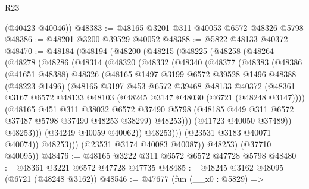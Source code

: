\begin{lexlean}{R23}
\begin{coremodule}
      (@40423 @40046))
@48383 := @48165 @3201 @311 @40053 @6572 @48326 @5798
@48386 := @48201 @3200 @39529 @40052
@48388 := @5822 @48133 @40372
@48470 := @48184
    (@48194
      (@48200
        (@48215
          (@48225
            (@48258
              (@48264
                (@48278
                  (@48286
                    (@48314
                      (@48320
                        (@48332
                          (@48340
                            (@48377
                              (@48383
                                (@48386
                                  (@41651 @48388)
                                  @48326
                                  (@48165
                                    @1497
                                    @3199
                                    @6572
                                    @39528
                                    @1496
                                    @48388
                                    (@48223 @1496)
                                    (@48165
                                      @3197
                                      @453
                                      @6572
                                      @39468
                                      @48133
                                      @40372
                                      (@48361
                                        @3167
                                        @6572
                                        @48133
                                        @48103
                                        (@48245 @3147 @48030 (@6721 (@48248 @3147))))
                                      (@48165
                                        @451
                                        @311
                                        @38032
                                        @6572
                                        @37490
                                        @5798
                                        (@48185 @449 @311 @6572 @37487 @5798 @37490 @48253 @38299)
                                        @48253)))
                                  (@41723 @40050 @37489))
                                @48253)))
                          (@34249 @40059 @40062))
                        @48253)))
                  (@23531 @3183 @40071 @40074))
                @48253)))
          (@23531 @3174 @40083 @40087))
        @48253)
      (@37710 @40095))
@48476 := @48165 @3222 @311 @6572 @6572 @47728 @5798
@48480 := @48361 @3221 @6572 @47728 @47735
@48485 := @48245 @3162 @48095 (@6721 (@48248 @3162))
@48546 := @47677
    (fun (__x0 : @5829) =>

\end{coremodule}
\end{lexlean}
